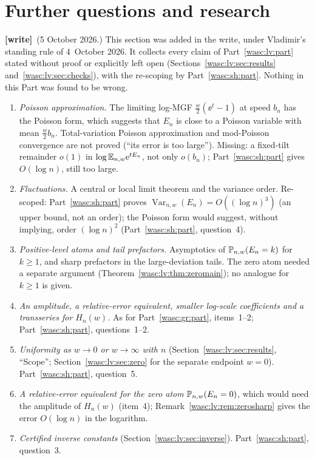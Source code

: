 \documentclass[11pt,a4paper]{article}
\theoremstyle{remark}\newtheorem{remark}[theorem]{Remark}
\numberwithin{equation}{section}
\newcommand{\wtag}{\textup{\textbf{[write]}}}
\begin{document}
\section{Further questions and research}\label{wasc:lv:sec:further}
\wtag\ (5 October 2026.) This section was added in the write, under Vladimir's standing rule of 4~October 2026. It collects every claim of Part~\ref{wasc:lv:part} stated without proof or explicitly left open (Sections~\ref{wasc:lv:sec:results} and~\ref{wasc:lv:sec:checks}), with the re-scoping by Part~\ref{wasc:sh:part}. Nothing in this Part was found to be wrong.
\begin{enumerate}[leftmargin=*,itemsep=3pt]
\item \emph{Poisson approximation.} The limiting log-MGF $\frac w2(\ee^t-1)$ at speed $b_n$ has the Poisson form, which suggests that $E_n$ is close to a Poisson variable with mean $\frac w2b_n$. Total-variation Poisson approximation and mod-Poisson convergence are not proved (``its error is too large''). Missing: a fixed-tilt remainder $o(1)$ in $\log\mathbb E_{n,w}\mathrm e^{tE_n}$, not only $o(b_n)$; Part~\ref{wasc:sh:part} gives $O(\log n)$, still too large.
\item \emph{Fluctuations.} A central or local limit theorem and the variance order. Re-scoped: Part~\ref{wasc:sh:part} proves $\operatorname{Var}_{n,w}(E_n)=O((\log n)^3)$ (an upper bound, not an order); the Poisson form would suggest, without implying, order $(\log n)^2$ (Part~\ref{wasc:sh:part}, question~4).
\item \emph{Positive-level atoms and tail prefactors.} Asymptotics of $\mathbb P_{n,w}(E_n=k)$ for $k\ge1$, and sharp prefactors in the large-deviation tails. The zero atom needed a separate argument (Theorem~\ref{wasc:lv:thm:zeromain}); no analogue for $k\ge1$ is given.
\item \emph{An amplitude, a relative-error equivalent, smaller log-scale coefficients and a transseries for $H_n(w)$.} As for Part~\ref{wasc:gr:part}, items~1--2; Part~\ref{wasc:sh:part}, questions~1--2.
\item \emph{Uniformity as $w\to0$ or $w\to\infty$ with $n$} (Section~\ref{wasc:lv:sec:results}, ``Scope''; Section~\ref{wasc:lv:sec:zero} for the separate endpoint $w=0$). Part~\ref{wasc:sh:part}, question~5.
\item \emph{A relative-error equivalent for the zero atom} $\mathbb P_{n,w}(E_n=0)$, which would need the amplitude of $H_n(w)$ (item~4); Remark~\ref{wasc:lv:rem:zerosharp} gives the error $O(\log n)$ in the logarithm.
\item \emph{Certified inverse constants} (Section~\ref{wasc:lv:sec:inverse}). Part~\ref{wasc:sh:part}, question~3.
\end{enumerate}
\end{document}
